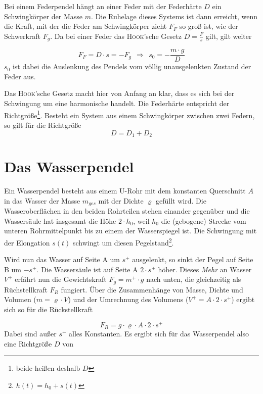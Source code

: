 Bei einem Federpendel hängt an einer Feder mit der Federhärte \(D\) ein Schwingkörper der Masse \(m\). Die Ruhelage dieses Systems ist dann erreicht, wenn die Kraft, mit der die Feder am Schwingkörper zieht \(F_F\) so groß ist, wie der Schwerkraft \(F_g\). Da bei einer Feder das \textsc{Hook}'sche Gesetz \(D = \frac{F}{s}\) gilt, gilt weiter

	\begin{equation}
		F_F = D \cdot s = - F_g ~~ \Rightarrow ~~ s_0 = - \frac{m \cdot g}{D}
			\label{s_0}
	\end{equation}
\(s_0\) ist dabei die Auslenkung des Pendels vom völlig unausgelenkten Zustand der Feder aus.

Das \textsc{Hook}'sche Gesetz macht hier von Anfang an klar, dass es sich bei der Schwingung um eine harmonische handelt. Die Federhärte entspricht der Richtgröße\footnote{beide heißen deshalb \(D\)}. Besteht ein System aus einem Schwingkörper zwischen zwei Federn, so gilt für die Richtgröße
\begin{equation}
	D = D_1 + D_2
\end{equation}
		
	
	
		\section{Das Wasserpendel}

Ein Wasserpendel besteht aus einem U-Rohr mit dem konstanten Querschnitt \(A\) in das Wasser der Masse \(m_{ges}\) mit der Dichte \(\varrho\) gefüllt wird. Die Wasseroberflächen in den beiden Rohrteilen stehen einander gegenüber und die Wassersäule hat insgesamt die Höhe \(2 \cdot h_0\), weil \(h_0\) die (gebogene) Strecke vom unteren Rohrmittelpunkt bis zu einem der Wasserspiegel ist. Die Schwingung mit der Elongation \(s(t)\) schwingt um diesen Pegelstand\footnote{\(h(t) = h_0 + s(t)\)}.


Wird nun das Wasser auf Seite A um \(s^{+}\) ausgelenkt, so sinkt der Pegel auf Seite B um \(- s^{+}\). Die Wassersäule ist auf Seite A \(2 \cdot s^{+}\) höher. Dieses \textit{Mehr} an Wasser \(V^{+}\) erfährt nun die Gewichtskraft \(F_g = m^{+} \cdot g\) nach unten, die gleichzeitig als Rüchstellkraft \(F_R\) fungiert. Über die Zusammenhänge von Masse, Dichte und Volumen (\(m = \varrho \cdot V\)) und der Umrechnung des Volumens (\(V^{+} = A \cdot 2 \cdot s^{+}\)) ergibt sich so für die Rückstellkraft
	
	\begin{equation}
		F_R = g \cdot \varrho \cdot A \cdot 2 \cdot s^{+}
			\label{rueckstellkraft_wsserpendel}
	\end{equation}
Dabei sind außer \(s^{+}\) alles Konstanten. Es ergibt sich für das Wasserpendel also eine Richtgröße \(D\)  von

